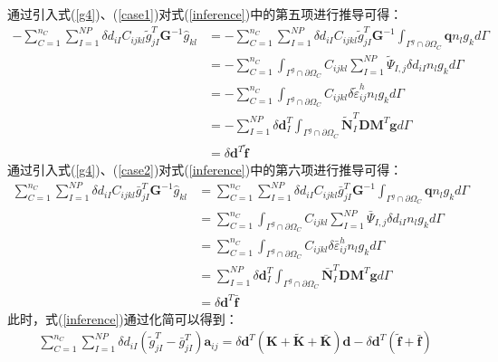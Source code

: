 通过引入式(\ref{g4})、(\ref{case1})对式(\ref{inference})中的第五项进行推导可得：
\begin{equation}
\begin{split}
    -\sum_{C=1}^{n_C}\sum_{I=1}^{N\!P}\delta d_{iI}C_{ijkl}\tilde{g}^T_{jI}\pmb{G}^{-1}\hat{g}_{kl}
    &=-\sum_{C=1}^{n_C}\sum_{I=1}^{N\!P}\delta d_{iI}C_{ijkl}\tilde{g}^T_{jI}\pmb{G}^{-1}\int_{\Gamma^g\cap\partial\Omega_C}\pmb{q}n_lg_kd\Gamma\\
    &=-\sum_{C=1}^{n_C}\int_{\Gamma^g\cap\partial\Omega_C}C_{ijkl}\sum_{I=1}^{N\!P}\tilde{\Psi}_{I,j}\delta d_{iI}n_lg_kd\Gamma\\
    &=-\sum_{C=1}^{n_C}\int_{\Gamma^g\cap\partial\Omega_C}C_{ijkl}\delta\tilde{\varepsilon}_{ij}^hn_lg_kd\Gamma\\
    &=-\sum_{I=1}^{N\!P}\delta\pmb{d}_I^T\int_{\Gamma^g\cap\partial\Omega_C}\tilde{\pmb{N}}_I^T\pmb{D}\pmb{M}^T\pmb{g}d\Gamma\\
    &=\delta\pmb{d}^T\tilde{\pmb{f}}
\end{split}
\end{equation}
通过引入式(\ref{g4})、(\ref{case2})对式(\ref{inference})中的第六项进行推导可得：
\begin{equation}
\begin{split}
    \sum_{C=1}^{n_C}\sum_{I=1}^{N\!P}\delta d_{iI}C_{ijkl}\bar{g}^T_{jI}\pmb{G}^{-1}\hat{g}_{kl}
    &=\sum_{C=1}^{n_C}\sum_{I=1}^{N\!P}\delta d_{iI}C_{ijkl}\bar{g}^T_{jI}\pmb{G}^{-1}\int_{\Gamma^g\cap\partial\Omega_C}\pmb{q}n_lg_kd\Gamma\\
    &=\sum_{C=1}^{n_C}\int_{\Gamma^g\cap\partial\Omega_C}C_{ijkl}\sum_{I=1}^{N\!P}\bar{\Psi}_{I,j}\delta d_{iI}n_lg_kd\Gamma\\
    &=\sum_{C=1}^{n_C}\int_{\Gamma^g\cap\partial\Omega_C}C_{ijkl}\delta\bar{\varepsilon}_{ij}^hn_lg_kd\Gamma\\
    &=\sum_{I=1}^{N\!P}\delta\pmb{d}_I^T\int_{\Gamma^g\cap\partial\Omega_C}\bar{\pmb{N}}_I^T\pmb{D}\pmb{M}^T\pmb{g}d\Gamma\\
    &=\delta\pmb{d}^T\bar{\pmb{f}}
\end{split}
\end{equation}
此时，式(\ref{inference})通过化简可以得到：
\begin{equation}\label{simplify}
\begin{split}
    \sum_{C=1}^{n_C}\sum_{I=1}^{N\!P}\delta d_{iI}(\tilde{g}_{jI}^T-\bar{g}_{jI}^T)\pmb{a}_{ij}=
    \delta\pmb{d}^T(\pmb{K}+\tilde{\pmb{K}}+\bar{\pmb{K}})\pmb{d}-\delta\pmb{d}^T(\tilde{\pmb{f}}+\bar{\pmb{f}})
\end{split}
\end{equation}
